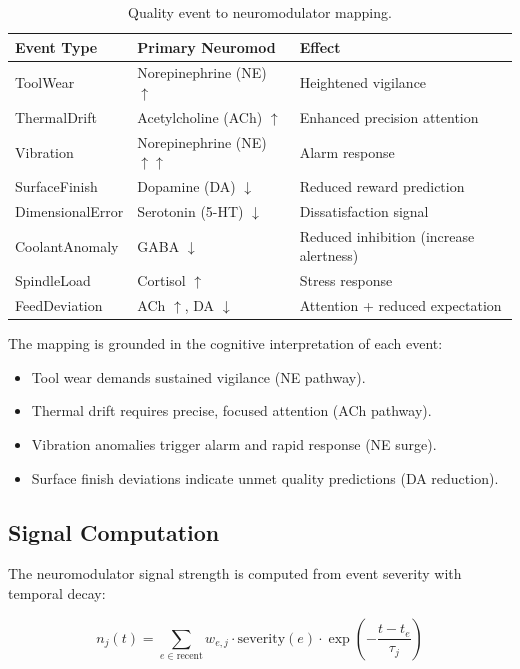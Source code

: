 \documentclass[11pt,a4paper]{article}
\begin{document}
\begin{table}[h]
\centering
\caption{Quality event to neuromodulator mapping.}
\label{tab:neuromod}
\begin{tabular}{@{}lll@{}}
\toprule
Event Type & Primary Neuromod & Effect \\
\midrule
ToolWear & Norepinephrine (NE) $\uparrow$ & Heightened vigilance \\
ThermalDrift & Acetylcholine (ACh) $\uparrow$ & Enhanced precision attention \\
Vibration & Norepinephrine (NE) $\uparrow\uparrow$ & Alarm response \\
SurfaceFinish & Dopamine (DA) $\downarrow$ & Reduced reward prediction \\
DimensionalError & Serotonin (5-HT) $\downarrow$ & Dissatisfaction signal \\
CoolantAnomaly & GABA $\downarrow$ & Reduced inhibition (increase alertness) \\
SpindleLoad & Cortisol $\uparrow$ & Stress response \\
FeedDeviation & ACh $\uparrow$, DA $\downarrow$ & Attention + reduced expectation \\
\bottomrule
\end{tabular}
\end{table}

The mapping is grounded in the cognitive interpretation of each event:
\begin{itemize}[nosep]
    \item Tool wear demands sustained vigilance (NE pathway).
    \item Thermal drift requires precise, focused attention (ACh pathway).
    \item Vibration anomalies trigger alarm and rapid response (NE surge).
    \item Surface finish deviations indicate unmet quality predictions (DA reduction).
\end{itemize}

\subsection{Signal Computation}

The neuromodulator signal strength is computed from event severity with temporal decay:

\begin{equation}
n_j(t) = \sum_{e \in \text{recent}} w_{e,j} \cdot \text{severity}(e) \cdot \exp\left(-\frac{t - t_e}{\tau_j}\right)
\end{equation}
\end{document}
